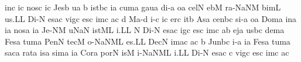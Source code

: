 \sgn {}in\punctum c\egn
\sgn {}i{}\punctum c\egn
\spatium
\sgn nos\punctum c\egn
{}i{}\punctum c\egn
\spatium
\sgn Jes\punctum b\egn
\sgn {}u{}\punctum a\egn
\spatium
\custos b
\lineaproxima
{}i{st}\pes bc\egn
\sgn {}i{}\punctum a\egn
\spatium
\sgn cum\punctum a\egn
\spatium
\sgn gau\punctum a\egn
\sgn di-\punctum a\egn
\sgn {}o{}\punctum a\egn
\spatium
\sgn cel\punctum N\egn
\sgn {}eb\punctum M\egn
\sgn ra-\pessubbipunctis NaNM\egn
\sgn bim\punctum L\egn
\sgn {}u{s.}\punctum L\augmentum L\egn
\spatium
\divisiofinalis
\spatium
\sgn Di-\punctum N\egn
\sgn {}es\pes ac\egn
\spatium
\sgn vig\punctum c\egn
\sgn {}es\punctum c\egn
\sgn {}im\punctum c\egn
\sgn {}a{}\punctum c\egn
\spatium
\custos d
\lineaproxima
\sgn Ma-\punctum d\egn
\sgn {}i{-}\punctum c\egn
\sgn {}i{}\punctum c\egn
\spatium
\sgn {}er\punctum c\egn
\sgn {}it\punctum b\egn
\spatium
\sgn {}As\punctum a\egn
\sgn cen\pes bc\egn
\sgn si-\punctum a\egn
\sgn {}o{}\punctum a\egn
\spatium
\sgn Dom\punctum a\egn
\sgn {}in\punctum a\egn
\sgn {}i{}\punctum a\egn
\spatium
\sgn nos\punctum a\egn
{}i{}\punctum a\egn
\spatium
\sgn Je-\clivis NM\egn
{}u{}\torculus NaN\egn
\spatium
{}i{st}\clivis ML\egn
\sgn {}i.\punctum L\augmentum L\egn
\spatium
\divisiofinalis
\spatium
\custos N
\lineaproxima
\sgn Di-\punctum N\egn
\sgn {}es\pes ac\egn
\spatium
{}ig\punctum c\egn
\sgn {}es\punctum c\egn
\sgn {}im\punctum c\egn
\sgn {}a{}\punctum b\egn
\spatium
\sgn {}ej\punctum a\egn
\sgn {}us\pes bc\egn
\sgn dem\punctum a\egn
\spatium
\sgn Fes\punctum a\egn
\sgn tum\punctum a\egn
\spatium
\sgn Pen\punctum N\egn
\sgn tec\punctum M\egn
\sgn {}o-\pessubbipunctis NaNM\nonspatium\punctuminclinatum L\egn
{}e{s.}\punctum L\augmentum L\egn
\spatium
\divisiofinalis
\spatium
\sgn Dec\punctum N\egn
\sgn {}im\pes ac\egn
\sgn {}a{}\punctum c\egn
\spatium
\custos b
\lineaproxima
\sgn Jun\pes bc\egn
\sgn {}i-\punctum a\egn
\sgn {}i{}\punctum a\egn
\spatium
\sgn Fes\punctum a\egn
\sgn tum\punctum a\egn
\spatium
\sgn sac\punctum a\egn
\sgn rat\punctum a\egn
\sgn {}is\punctum a\egn
\sgn sim\punctum a\egn
\sgn {}i{}\punctum a\egn
\spatium
\sgn Cor\punctum a\egn
\sgn por\punctum N\egn
\sgn {}is\punctum M\egn
\spatium
{}i-\pessubbipunctis NaNM\nonspatium\punctuminclinatum L\egn
{}i.\punctum L\augmentum L\egn
\spatium
\divisiofinalis
\spatium
\sgn Di-\punctum N\egn
\sgn {}es\pes ac\egn
\spatium
\custos c
\lineaproxima
\sgn vig\punctum c\egn
\sgn {}es\punctum c\egn
\sgn {}im\punctum c\egn
\sgn {}a{}\punctum c\egn
\spatium
